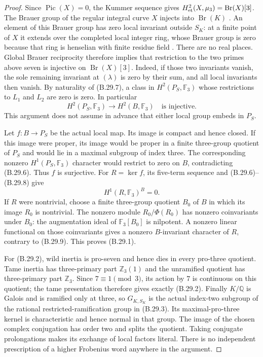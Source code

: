 \begin{proof}
Since $\operatorname{Pic}(X)=0$, the Kummer sequence gives
$H^2_{\rm et}(X,\mu_3)=\operatorname{Br}(X)[3]$.
The Brauer group of the regular integral curve $X$ injects
into $\operatorname{Br}(K)$
\citep[Theorem 3.5.4]{CBColliotTheleneSkorobogatov2019}.
An element of this Brauer group has zero local invariant outside
$S_K$: at a finite point of $X$ it extends over the completed
local integer ring, whose Brauer group is zero because that
ring is henselian with finite residue field
\citep[Theorem 3.4.2]{CBColliotTheleneSkorobogatov2019}.
There are no real places.  Global Brauer reciprocity
\citep[VIII, Theorem 4.2]{BMilneCFT2020} therefore implies that
restriction to the two primes above seven is injective on
$\operatorname{Br}(X)[3]$.  Indeed, if those two invariants
vanish, the sole remaining invariant at $(\lambda)$ is zero
by their sum, and all local invariants then vanish.
By naturality of (B.29.7), a class in $H^2(P_S,\mathbb F_3)$
whose restrictions to $L_1$ and $L_2$ are zero is zero.
In particular
\[
                H^2(P_S,\mathbb F_3)\longrightarrow
                       H^2(B,\mathbb F_3)
                      \quad\text{is injective}.              \tag{B.29.8}
\]
This argument does not assume in advance that either local
group embeds in $P_S$.

Let $f:B\to P_S$ be the actual local map.  Its image is compact
and hence closed.  If this image were proper, its image would be
proper in a finite three-group quotient of $P_S$ and would lie
in a maximal subgroup of index three.  The corresponding
nonzero $H^1(P_S,\mathbb F_3)$ character would restrict to zero
on $B$, contradicting (B.29.6).  Thus $f$ is surjective.
For $R=\ker f$, its five-term sequence and (B.29.6)--(B.29.8)
give
\[
                  H^1(R,\mathbb F_3)^{B}=0.                  \tag{B.29.9}
\]
If $R$ were nontrivial, choose a finite three-group quotient
$B_0$ of $B$ in which its image $R_0$ is nontrivial.
The nonzero module $R_0/\Phi(R_0)$ has nonzero coinvariants
under $B_0$: the augmentation ideal of $\mathbb F_3[B_0]$ is
nilpotent.  A nonzero linear functional on those coinvariants
gives a nonzero $B$-invariant character of $R$, contrary to
(B.29.9).  This proves (B.29.1).

For (B.29.2), wild inertia is pro-seven and hence dies in every
pro-three quotient.  Tame inertia has three-primary part
$\mathbb Z_3(1)$ and the unramified quotient has three-primary
part $\mathbb Z_3$.  Since $7\equiv1\pmod3$, its action by
$7$ is continuous on this quotient; the tame presentation
therefore gives exactly (B.29.2).
Finally $K/\mathbb Q$ is Galois and is ramified only at three,
so $G_{K,S_K}$ is the actual index-two subgroup of the rational
restricted-ramification group in (B.29.3).
Its maximal-pro-three kernel is characteristic and hence normal
in that group.  The image of the chosen complex conjugation
has order two and splits the quotient.  Taking conjugate
prolongations makes its exchange of local factors literal.
There is no independent prescription of a higher Frobenius
word anywhere in the argument.
\end{proof}

